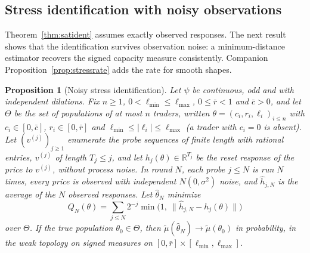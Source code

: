 \documentclass[12pt]{article}
\newtheorem{proposition}[theorem]{Proposition}
\theoremstyle{definition}
\theoremstyle{remark}
\begin{document}
\subsection{Stress identification with noisy observations}\label{app:noisystress}

Theorem~\ref{thm:satident} assumes exactly observed responses. The next result shows that the identification survives observation noise: a minimum-distance estimator recovers the signed capacity measure consistently. Companion Proposition~\ref{prop:stressrate} adds the rate for smooth shapes.

\begin{proposition}[Noisy stress identification]\label{prop:noisystress}
Let $\psi$ be continuous, odd and with independent dilations. Fix $n\ge1$, $0<\ell_{\min}\le\ell_{\max}$, $0\le\bar r<1$ and $\bar c>0$, and let $\Theta$ be the set of populations of at most $n$ traders, written $\theta=(c_i,r_i,\ell_i)_{i\le n}$ with $c_i\in[0,\bar c]$, $r_i\in[0,\bar r]$ and $\ell_{\min}\le|\ell_i|\le\ell_{\max}$ (a trader with $c_i=0$ is absent). Let $(v^{(j)})_{j\ge1}$ enumerate the probe sequences of finite length with rational entries, $v^{(j)}$ of length $T_j\le j$, and let $h_j(\theta)\in\mathbb R^{T_j}$ be the reset response of the price to $v^{(j)}$, without process noise. In round $N$, each probe $j\le N$ is run $N$ times, every price is observed with independent $N(0,\sigma^2)$ noise, and $\hat h_{j,N}$ is the average of the $N$ observed responses. Let $\hat\theta_N$ minimize
\[
 Q_N(\theta)=\sum_{j\le N}2^{-j}\min\bigl(1,\ \|\hat h_{j,N}-h_j(\theta)\|\bigr)
\]
over $\Theta$. If the true population $\theta_0\in\Theta$, then $\tilde\mu(\hat\theta_N)\to\tilde\mu(\theta_0)$ in probability, in the weak topology on signed measures on $[0,\bar r]\times[\ell_{\min},\ell_{\max}]$.
\end{proposition}
\end{document}
